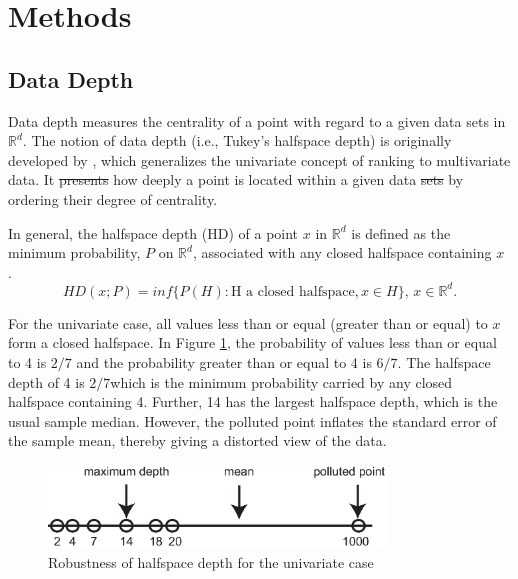 \documentclass[a4paper,UKenglish]{lipics-v2016}
\providecommand{\DIFadd}[1]{{\protect\color{blue}\uwave{#1}}} %
\providecommand{\DIFdel}[1]{{\protect\color{red}\sout{#1}}}                      %
\providecommand{\DIFaddbegin}{} %
\providecommand{\DIFaddend}{} %
\providecommand{\DIFdelbegin}{} %
\providecommand{\DIFdelend}{} %
\begin{document}
\section{Methods}
\label{sec:methods}

\subsection{Data Depth}
Data depth measures the centrality of a point with regard to a given data sets in $\mathbb{R}^d$.
The notion of data depth (i.e., Tukey's halfspace depth) is originally developed by \cite{tukey75ICM}, which generalizes the univariate concept of ranking to multivariate data.
It \DIFdelbegin \DIFdel{presents }\DIFdelend \DIFaddbegin \DIFadd{reveals }\DIFaddend how deeply a point is located within a given data \DIFdelbegin \DIFdel{sets }\DIFdelend \DIFaddbegin \DIFadd{set }\DIFaddend by ordering their degree of centrality. 
\DIFdelbegin %

\DIFdelend In general, the halfspace depth (HD) of a point $x$ in  $\mathbb{R}^d$ is defined as the minimum probability, $P$ on  $\mathbb{R}^d$, associated with any closed halfspace containing $x$ \cite{liu00AS}. 
\begin{equation*}\label{eq:hd}
HD(x;P) = inf\{P(H): \text{H a closed halfspace}, x \in H\}\text{, } x \in \mathbb{R}^d.
\end{equation*}

For the univariate case, all values less than or equal (greater than or equal) to $x$ form a closed halfspace. 
In Figure \ref{fig:hd_uni}, the probability of values less than or equal to 4 is  $2/7$ and the probability greater than or equal to 4 is $6/7$. 
The halfspace depth of 4 is $2/7$\DIFaddbegin \DIFadd{, }\DIFaddend which is the minimum probability carried by any closed halfspace containing 4. 
Further, 14 has the largest halfspace depth, which is the usual sample median. 
However, the polluted point inflates the standard error of the sample mean, thereby giving a distorted view of the data. 

\begin{figure}
	\centering
	\includegraphics[width=0.8\textwidth]{images/depth_uni.eps}
	\caption{Robustness of halfspace depth for the univariate case}
	\label{fig:hd_uni}	
\end{figure}
\end{document}
